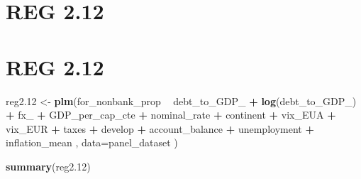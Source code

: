 \documentclass[]{article}
\newenvironment{Shaded}{\begin{snugshade}}{\end{snugshade}}
\newcommand{\KeywordTok}[1]{\textcolor[rgb]{0.13,0.29,0.53}{\textbf{#1}}}
\newcommand{\DataTypeTok}[1]{\textcolor[rgb]{0.13,0.29,0.53}{#1}}
\newcommand{\DecValTok}[1]{\textcolor[rgb]{0.00,0.00,0.81}{#1}}
\newcommand{\StringTok}[1]{\textcolor[rgb]{0.31,0.60,0.02}{#1}}
\newcommand{\OperatorTok}[1]{\textcolor[rgb]{0.81,0.36,0.00}{\textbf{#1}}}
\newcommand{\NormalTok}[1]{#1}
\begin{document}
\section{REG 2.12}\label{reg-2.12}

\section{REG 2.12}\label{reg-2.12-1}

\begin{Shaded}
\begin{Highlighting}[]
\NormalTok{reg2.}\DecValTok{12}\NormalTok{ <-}\StringTok{ }\KeywordTok{plm}\NormalTok{(for_nonbank_prop }\OperatorTok{~}\StringTok{  }\NormalTok{debt_to_GDP_ }\OperatorTok{+}\StringTok{ }\KeywordTok{log}\NormalTok{(debt_to_GDP_) }\OperatorTok{+}\StringTok{ }\NormalTok{fx_ }\OperatorTok{+}\StringTok{ }\NormalTok{GDP_per_cap_cte }\OperatorTok{+}\StringTok{  }\NormalTok{nominal_rate }\OperatorTok{+}\StringTok{ }\NormalTok{continent }\OperatorTok{+}\StringTok{ }\NormalTok{vix_EUA }\OperatorTok{+}\StringTok{ }\NormalTok{vix_EUR }\OperatorTok{+}\StringTok{ }\NormalTok{taxes }\OperatorTok{+}\StringTok{ }\NormalTok{develop }\OperatorTok{+}\StringTok{ }\NormalTok{account_balance }\OperatorTok{+}\StringTok{  }\NormalTok{unemployment }\OperatorTok{+}\StringTok{ }\NormalTok{inflation_mean , }\DataTypeTok{data=}\NormalTok{panel_dataset  )}

\KeywordTok{summary}\NormalTok{(reg2.}\DecValTok{12}\NormalTok{)}
\end{Highlighting}
\end{Shaded}
\end{document}
